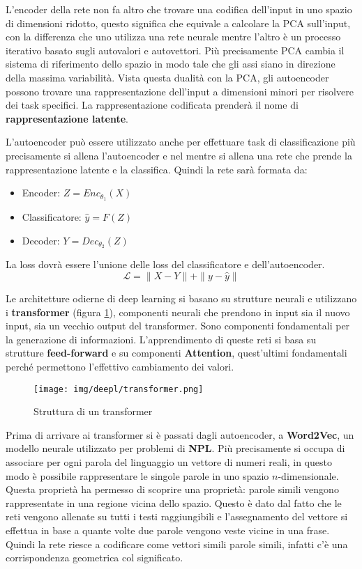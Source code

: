 L'encoder della rete non fa altro che trovare una codifica dell'input in uno
spazio di dimensioni ridotto, questo significa che equivale a calcolare la PCA
sull'input, con la differenza che uno utilizza una rete neurale mentre l'altro
è un processo iterativo basato sugli autovalori e autovettori. Più precisamente
PCA cambia il sistema di riferimento dello spazio in modo tale che gli assi
siano in direzione della massima variabilità. Vista questa dualità con la PCA,
gli autoencoder possono trovare una rappresentazione dell'input a dimensioni
minori per risolvere dei task specifici. La rappresentazione codificata prenderà
il nome di \textbf{rappresentazione latente}.

L'autoencoder può essere utilizzato anche per effettuare task di classificazione
più precisamente si allena l'autoencoder e nel mentre si allena una rete che
prende la rappresentazione latente e la classifica. Quindi la rete sarà formata
da:
\begin{itemize}
      \item Encoder: $Z = Enc_{\theta_1}(X)$
      \item Classificatore: $\hat{y} = F(Z)$
      \item Decoder: $Y = Dec_{\theta_2}(Z)$
\end{itemize}
La loss dovrà essere l'unione delle loss del classificatore e dell'autoencoder.
\begin{equation}
      \mathcal{L} = \| X - Y \| + \| y - \hat{y} \|
\end{equation}

Le architetture odierne di deep learning si basano su strutture neurali e
utilizzano i \textbf{transformer} (figura \ref{fig:transformer}), componenti
neurali che prendono in input sia il nuovo input, sia un vecchio output del
transformer. Sono componenti fondamentali per la generazione di informazioni.
L'apprendimento di queste reti si basa su strutture \textbf{feed-forward} e su
componenti \textbf{Attention}, quest'ultimi fondamentali perché permettono
l'effettivo cambiamento dei valori.
\begin{figure}[!ht]
      \centering
      \texttt{[image: img/deepl/transformer.png]}
      \caption{Struttura di un transformer}
      \label{fig:transformer}
\end{figure}
Prima di arrivare ai transformer si è passati dagli autoencoder, a
\textbf{Word2Vec}, un modello neurale utilizzato per problemi di \textbf{NPL}.
Più precisamente si occupa di associare per ogni parola del linguaggio un vettore
di numeri reali, in questo modo è possibile rappresentare le singole parole in
uno spazio $n$-dimensionale. Questa proprietà ha permesso di scoprire una
proprietà: parole simili vengono rappresentate in una regione vicina dello
spazio. Questo è dato dal fatto che le reti vengono allenate su tutti i testi
raggiungibili e l'assegnamento del vettore si effettua in base a quante volte
due parole vengono veste vicine in una frase. Quindi la rete riesce a codificare
come vettori simili parole simili, infatti c'è una corrispondenza geometrica col
significato.

